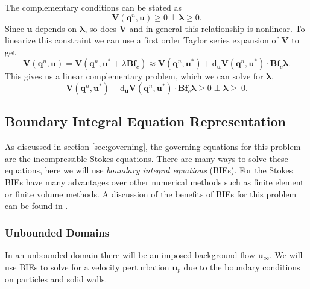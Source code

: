 \documentclass[preprint, 10pt]{elsarticle}
\begin{document}
The complementary conditions can be stated as
\[ \mathbf{V}(\mathbf{q}^n,\mathbf{u}) \geq 0 \perp \pmb{\lambda} \geq 0.\]
Since $\mathbf{u}$ depends on $\pmb{\lambda}$, so does $\mathbf{V}$ and in general this relationship is nonlinear. To linearize this constraint we can use a first order Taylor series expansion of $\mathbf{V}$ to get
\[ \mathbf{V}(\mathbf{q}^n,\mathbf{u}) = \mathbf{V}(\mathbf{q}^n,\mathbf{u}^* + \lambda \mathbf{B} \mathbf{f}_c) \approx \mathbf{V}(\mathbf{q}^n,\mathbf{u}^*) + \text{d}_\mathbf{u}\mathbf{V}(\mathbf{q}^n,\mathbf{u}^*)\cdot\mathbf{B}\mathbf{f}_c\pmb{\lambda}.\]
This gives us a linear complementary problem, which we can solve for $\pmb{\lambda}$,
\[ \mathbf{V}(\mathbf{q}^n,\mathbf{u}^*) + \text{d}_\mathbf{u}\mathbf{V}(\mathbf{q}^n,\mathbf{u}^*)\cdot\mathbf{B}\mathbf{f}_c\pmb{\lambda} \geq 0 \perp \pmb{\lambda} \geq \ 0.\]



\subsection{Boundary Integral Equation Representation}

As discussed in section \ref{sec:governing}, the governing equations for this problem are the incompressible Stokes equations. There are many ways to solve these equations, here we will use \textit{boundary integral equations} (BIEs). For the Stokes BIEs have many advantages over other numerical methods such as finite element or finite volume methods. A discussion of the benefits of BIEs for this problem can be found in \cite{Karrila1989}. 

\subsubsection{Unbounded Domains}

In an unbounded domain there will be an imposed background flow $\mathbf{u}_{\infty}$. We will use BIEs to solve for a velocity perturbation $\mathbf{u}_p$ due to the boundary conditions on particles and solid walls.
\end{document}
